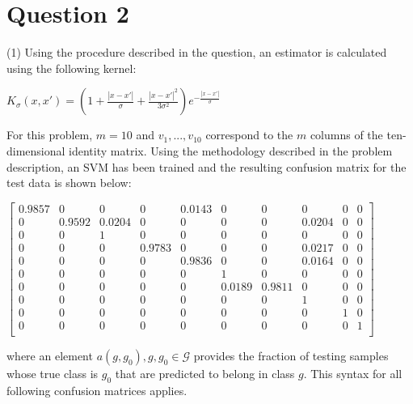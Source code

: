 \section*{Question 2}
(1) Using the procedure described in the question, an estimator is calculated using the following kernel:
\begin{center}
    \large{$K_{\sigma}(x, x') = (1 + \frac{|x - x'|}{\sigma} + \frac{{|x - x'|}^{2}}{3{\sigma}^{2}})e^{-\frac{|x - x'|}{\sigma}}$}
\end{center}
For this problem, $m = 10$ and $v_{1},...,v_{10}$ correspond to the $m$ columns of the ten-dimensional identity matrix. Using the methodology described in the problem description, an SVM has been trained and the resulting confusion matrix for the test data is shown below:
\begin{center}
    $\begin{bmatrix}
        0.9857 & 0 & 0 & 0 & 0.0143 & 0 & 0 & 0 & 0 & 0 \\
        0 & 0.9592 & 0.0204 & 0 & 0 & 0 & 0 & 0.0204 & 0 & 0 \\
        0 & 0 & 1 & 0 & 0 & 0 & 0 & 0 & 0 & 0 \\
        0 & 0 & 0 & 0.9783 & 0 & 0 & 0 & 0.0217 & 0 & 0 \\
        0 & 0 & 0 & 0 & 0.9836 & 0 & 0 & 0.0164 & 0 & 0 \\
        0 & 0 & 0 & 0 & 0 & 1 & 0 & 0 & 0 & 0 \\
        0 & 0 & 0 & 0 & 0 & 0.0189 & 0.9811 & 0 & 0 & 0 \\
        0 & 0 & 0 & 0 & 0 & 0 & 0 & 1 & 0 & 0 \\
        0 & 0 & 0 & 0 & 0 & 0 & 0 & 0 & 1 & 0 \\
        0 & 0 & 0 & 0 & 0 & 0 & 0 & 0 & 0 & 1 \\
    \end{bmatrix}$
\end{center}
where an element $a(g, g_{0}), g, g_{0} \in \mathcal{G}$ provides the fraction of testing samples whose true class is $g_{0}$ that are predicted to belong in class $g$. This syntax for all following confusion matrices applies.

